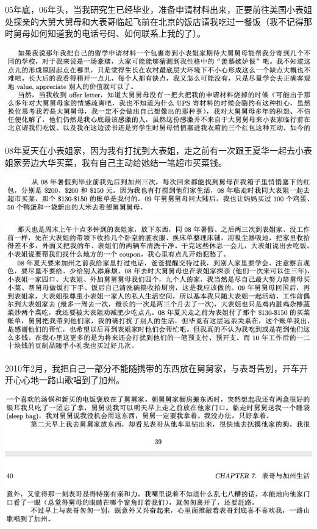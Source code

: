 \documentclass[9pt, b5paper]{article}
\begin{document}
05年底，06年头，当我研究生已经毕业，准备申请材料出来，正要前往美国小表姐处探亲的大舅大舅母和大表哥临起飞前在北京的饭店请我吃过一餐饭（我不记得那时舅母如何知道我的电话号码、如何联系上我的了）。

\begin{center}
\includegraphics[width=.9\linewidth]{./pic/p1p124.png}
\end{center}

08年夏天在小表姐家，因为我有打扰到大表姐，走之前有一次跟王夏华一起去小表姐家旁边大华买菜，我有自己主动给她结一笔超市买菜钱。 

\begin{center}
\includegraphics[width=.9\linewidth]{./pic/p1p47.png}
\end{center}

\begin{center}
\includegraphics[width=.9\linewidth]{./pic/p1p91-2.png}
\end{center}

2010年2月，我把自己一部分不能随携带的东西放在舅舅家，与表哥告别，开车开开心心地一路山歌唱到了加州。

\begin{center}
\includegraphics[width=.9\linewidth]{./pic/p1p39.png}
\end{center}
\end{document}
